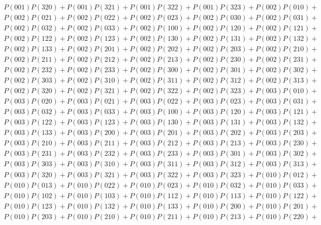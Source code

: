 \documentclass{article}
\theoremstyle{definition}
\begin{document}
\begin{gather*}
        P(001)P(320) + P(001)P(321) + P(001)P(322) + P(001)P(323) + P(002)P(010) +\\
        P(002)P(021) + P(002)P(022) + P(002)P(023) + P(002)P(030) + P(002)P(031) +\\
        P(002)P(032) + P(002)P(033) + P(002)P(100) + P(002)P(120) + P(002)P(121) +\\
        P(002)P(122) + P(002)P(123) + P(002)P(130) + P(002)P(131) + P(002)P(132) +\\
        P(002)P(133) + P(002)P(201) + P(002)P(202) + P(002)P(203) + P(002)P(210) +\\
        P(002)P(211) + P(002)P(212) + P(002)P(213) + P(002)P(230) + P(002)P(231) +\\
        P(002)P(232) + P(002)P(233) + P(002)P(300) + P(002)P(301) + P(002)P(302) +\\
        P(002)P(303) + P(002)P(310) + P(002)P(311) + P(002)P(312) + P(002)P(313) +\\
        P(002)P(320) + P(002)P(321) + P(002)P(322) + P(002)P(323) + P(003)P(010) +\\
        P(003)P(020) + P(003)P(021) + P(003)P(022) + P(003)P(023) + P(003)P(031) +\\
        P(003)P(032) + P(003)P(033) + P(003)P(100) + P(003)P(120) + P(003)P(121) +\\
        P(003)P(122) + P(003)P(123) + P(003)P(130) + P(003)P(131) + P(003)P(132) +\\
        P(003)P(133) + P(003)P(200) + P(003)P(201) + P(003)P(202) + P(003)P(203) +\\
        P(003)P(210) + P(003)P(211) + P(003)P(212) + P(003)P(213) + P(003)P(230) +\\
        P(003)P(231) + P(003)P(232) + P(003)P(233) + P(003)P(301) + P(003)P(302) +\\
        P(003)P(303) + P(003)P(310) + P(003)P(311) + P(003)P(312) + P(003)P(313) +\\
        P(003)P(320) + P(003)P(321) + P(003)P(322) + P(003)P(323) + P(010)P(012) +\\
        P(010)P(013) + P(010)P(022) + P(010)P(023) + P(010)P(032) + P(010)P(033) +\\
        P(010)P(102) + P(010)P(103) + P(010)P(112) + P(010)P(113) + P(010)P(122) +\\
        P(010)P(123) + P(010)P(132) + P(010)P(133) + P(010)P(200) + P(010)P(201) +\\
        P(010)P(203) + P(010)P(210) + P(010)P(211) + P(010)P(213) + P(010)P(220) +\\

\end{gather*}
\end{document}

